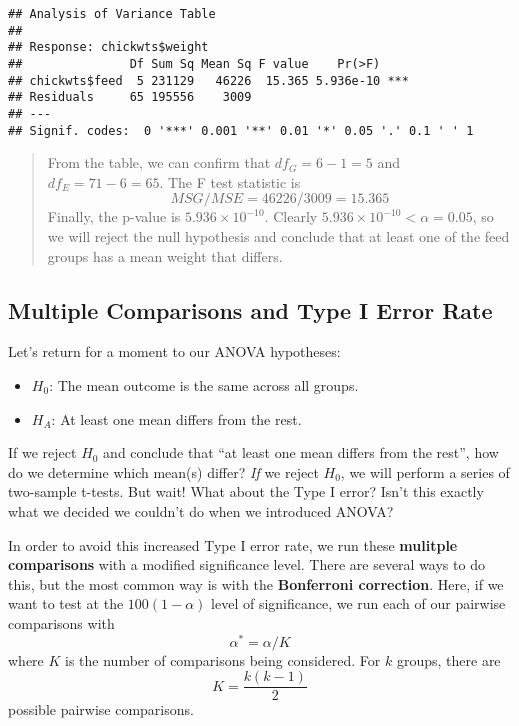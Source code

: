 \documentclass[
]{book}
\providecommand{\tightlist}{%
  \setlength{\itemsep}{0pt}\setlength{\parskip}{0pt}}
\begin{document}
\begin{verbatim}
## Analysis of Variance Table
## 
## Response: chickwts$weight
##               Df Sum Sq Mean Sq F value    Pr(>F)    
## chickwts$feed  5 231129   46226  15.365 5.936e-10 ***
## Residuals     65 195556    3009                      
## ---
## Signif. codes:  0 '***' 0.001 '**' 0.01 '*' 0.05 '.' 0.1 ' ' 1
\end{verbatim}

\begin{quote}
From the table, we can confirm that \(df_G = 6-1 = 5\) and \(df_E = 71 - 6 = 65\). The F test statistic is \[MSG/MSE = 46226 / 3009 = 15.365\] Finally, the p-value is \(5.936\times10^{-10}\). Clearly \(5.936\times10^{-10} < \alpha = 0.05\), so we will reject the null hypothesis and conclude that at least one of the feed groups has a mean weight that differs.
\end{quote}

\hypertarget{multiple-comparisons-and-type-i-error-rate}{%
\subsection{Multiple Comparisons and Type I Error Rate}\label{multiple-comparisons-and-type-i-error-rate}}

Let's return for a moment to our ANOVA hypotheses:

\begin{itemize}
\tightlist
\item
  \(H_0\): The mean outcome is the same across all groups.
\item
  \(H_A\): At least one mean differs from the rest.
\end{itemize}

If we reject \(H_0\) and conclude that ``at least one mean differs from the rest'', how do we determine which mean(s) differ? \emph{If} we reject \(H_0\), we will perform a series of two-sample t-tests. But wait! What about the Type I error? Isn't this exactly what we decided we couldn't do when we introduced ANOVA?

In order to avoid this increased Type I error rate, we run these \textbf{mulitple comparisons} with a modified significance level. There are several ways to do this, but the most common way is with the \textbf{Bonferroni correction}. Here, if we want to test at the \(100(1-\alpha)\) level of significance, we run each of our pairwise comparisons with \[\alpha^* = \alpha/K\] where \(K\) is the number of comparisons being considered. For \(k\) groups, there are \[K = \frac{k(k-1)}{2}\] possible pairwise comparisons.
\end{document}
